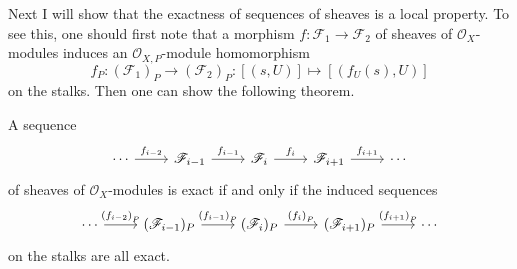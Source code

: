 Next I will show that the exactness of sequences of sheaves
is a local property. To see this, one should first note that a morphism
$f:\mathscr{F}_{1}\to\mathscr{F}_{2}$ of sheaves of
$\mathscr{O}_{X}$-modules induces an $\mathscr{O}_{X,P}$-module homomorphism
\[
  f_{P}:\left(\mathscr{F}_{1}\right)_{P}\to\left(\mathscr{F}_{2}\right)_{P}
  :[(s,U)]\mapsto [(f_{U}(s),U)]
\]
on the stalks. Then one can show the following theorem.
\begin{thm}%
  \label{thm:ses_equivalence}
  A sequence
  \[\begin{tikzcd}
      \cdots\rar{f_{i-2}} & \mathscr{F}_{i-1}\rar{f_{i-1}}
      & \mathscr{F}_{i}\rar{f_{i}} & \mathscr{F}_{i+1}\rar{f_{i+1}} & \cdots
    \end{tikzcd}\]
  of sheaves of $\mathscr{O}_{X}$-modules is exact if and only if the
  induced sequences
  \[\begin{tikzcd}
      \cdots\rar{\left(f_{i-2}\right)_{P}}
      & (\mathscr{F}_{i-1})_{P}\rar{\left(f_{i-1}\right)_{P}}
      & (\mathscr{F}_{i})_{P}\rar{\left(f_{i}\right)_{P}}
      & (\mathscr{F}_{i+1})_{P}\rar{\left(f_{i+1}\right)_{P}} & \cdots
    \end{tikzcd}\]
  on the stalks are all exact.
\end{thm}
